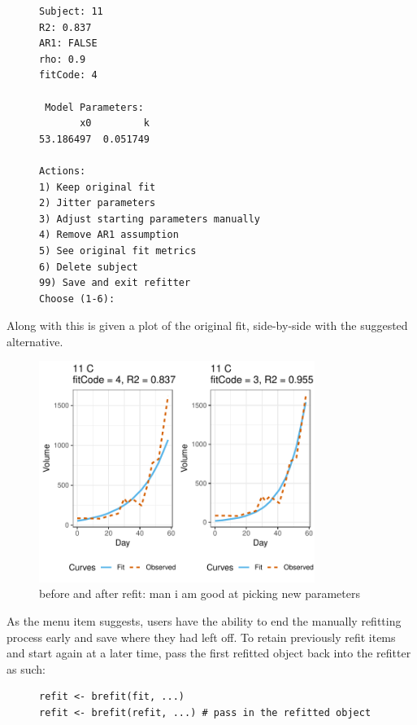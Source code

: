 \documentclass{article}
\begin{document}
\begin{singlespace}
\begin{figure}[H]
\centering
\begin{BVerbatim}
Subject: 11
R2: 0.837
AR1: FALSE
rho: 0.9
fitCode: 4

 Model Parameters:
       x0         k 
53.186497  0.051749 

Actions:
1) Keep original fit
2) Jitter parameters
3) Adjust starting parameters manually
4) Remove AR1 assumption
5) See original fit metrics
6) Delete subject
99) Save and exit refitter
Choose (1-6):
\end{BVerbatim}
\end{figure}
\end{singlespace}



Along with this is given a plot of the original fit, side-by-side with the suggested alternative. 

\begin{figure}[H]
\centering
\includegraphics[width=0.8\textwidth]{img/mouse_refit_plot.pdf}
\caption{before and after refit: man i am good at picking new parameters}
\end{figure}

As the menu item suggests, users have the ability to end the manually refitting process early and save where they had left off. To retain previously refit items and start again at a later time, pass the first refitted object back into the refitter as such:

\begin{singlespace}
\begin{figure}[H]
\centering
\begin{BVerbatim}
refit <- brefit(fit, ...)
refit <- brefit(refit, ...) # pass in the refitted object
\end{BVerbatim}
\end{figure}
\end{singlespace}
\end{document}
